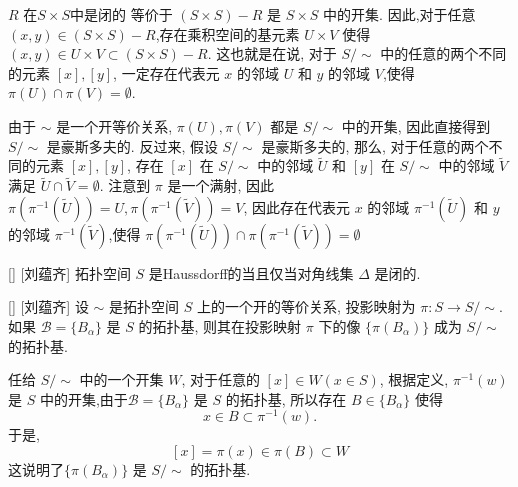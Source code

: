 \documentclass[UTF8]{ctexart}
\begin{document}
        \begin{prf}
             \(R\) 在\( S \times S \)中是闭的 等价于 
             \((S \times S) - R\) 是 \(S \times S\) 中的开集. 因此,对于任意 \((x,y) \in (S \times S) - R\),存在乘积空间的基元素 \(U \times V\) 使得 \((x,y) \in U \times V \subset (S \times S) - R\). 这也就是在说, 对于 \(S / \sim\) 中的任意的两个不同的元素 \([x],[y]\), 一定存在代表元 \(x\) 的邻域 \(U\) 和 \(y\) 的邻域 \(V\),使得 \(\pi(U) \cap \pi(V) = \emptyset\). 
            
            由于 \(\sim\) 是一个开等价关系,  \(\pi(U), \pi(V)\) 都是 \(S/\sim\) 中的开集, 因此直接得到 \(S/\sim\) 是豪斯多夫的. 反过来, 假设 \(S/\sim\) 是豪斯多夫的, 那么, 对于任意的两个不同的元素 \([x],[y]\), 存在 \([x]\) 在 \(S/\sim\) 中的邻域 \(\tilde{U}\) 和 \([y]\) 在 \(S/\sim\) 中的邻域 \(\tilde{V}\) 满足 \(\tilde{U} \cap \tilde{V} = \emptyset\). 注意到 \(\pi\) 是一个满射, 因此 \(\pi(\pi^{-1}(\tilde{U})) = U, \pi(\pi^{-1}(\tilde{V})) = V\), 因此存在代表元 \(x\) 的邻域 \(\pi^{-1}(\tilde{U})\) 和 \(y\) 的邻域 \(\pi^{-1}(\tilde{V})\),使得 \(\pi(\pi^{-1}(\tilde{U})) \cap \pi(\pi^{-1}(\tilde{V})) = \emptyset\) 
        \end{prf}
        
        \begin{crl}
            []
            {}
            []
            [刘蕴齐]
            拓扑空间 \(S\) 是Haussdorff的当且仅当对角线集 \(\Delta\) 是闭的. 
        \end{crl}

        \begin{thm}
            []
            {}
            []
            [刘蕴齐]
            设 \( \sim \) 是拓扑空间 \( S \) 上的一个开的等价关系, 投影映射为 \( \pi: S \to S/\sim \). 
            如果 \( \mathcal{B} = \{ B_{\alpha} \} \) 是 \( S \) 的拓扑基, 则其在投影映射 \( \pi \) 下的像 \( \{ \pi(B_{\alpha}) \} \) 成为 \( S/\sim \) 的拓扑基. 
        \end{thm}
        
        \begin{prf}
            任给 \(S/\sim\) 中的一个开集 \(W\), 对于任意的 \([x] \in W(x \in S)\), 根据定义,  \(\pi^{-1}(w)\) 是 \(S\) 中的开集,由于\( \mathcal{B} = \{ B_{\alpha} \} \) 是 \( S \) 的拓扑基, 所以存在 \(B \in \{ B_{\alpha} \}\) 使得
            \[
                x \in B \subset \pi^{-1}(w).
            \]
            于是,
            \[
                [x] = \pi(x) \in \pi(B) \subset W
            \]
            这说明了\( \{ \pi(B_{\alpha}) \} \) 是 \( S/\sim \) 的拓扑基. 
        \end{prf}
\end{document}
